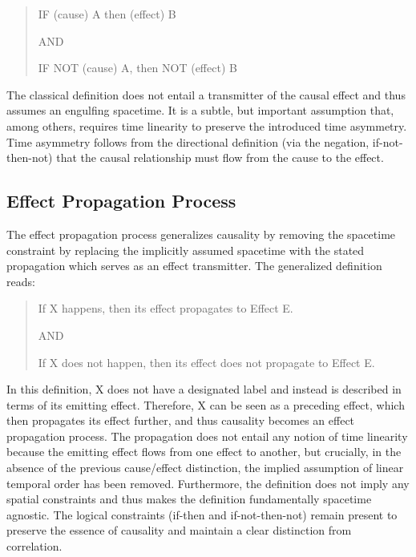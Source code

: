\documentclass{article}
\begin{document}
\begin{quote}
\begin{center}
        IF (cause) A then (effect) B

    AND 
    
    IF NOT (cause) A, then NOT (effect) B
\end{center}
\end{quote}


The classical definition does not entail a transmitter of the causal effect and thus assumes an engulfing spacetime. It is a subtle, but important assumption that, among others, requires time linearity to preserve the introduced time asymmetry. Time asymmetry follows from the directional definition (via the negation, if-not-then-not) that the causal relationship must flow from the cause to the effect.


\subsection{Effect Propagation Process}
\label{subsec:Effect_Propagation_Process}

The effect propagation process\cite{Hansen2025EPP} generalizes causality by removing the spacetime constraint by replacing the implicitly assumed spacetime with the stated propagation which serves as an effect transmitter. The generalized definition reads:

\begin{quote}
\begin{center}
        If X happens, then its effect propagates to Effect E.
    
    AND
    
    If X does not happen, then its effect does not propagate to Effect E.
\end{center}
\end{quote}


In this definition, X does not have a designated label and instead is described in terms of its emitting effect. Therefore, X can be seen as a preceding effect, which then propagates its effect further, and thus causality becomes an effect propagation process. The propagation does not entail any notion of time linearity because the emitting effect flows from one effect to another, but crucially, in the absence of the previous cause/effect distinction, the implied assumption of linear temporal order has been removed.
Furthermore, the definition does not imply any spatial constraints and thus makes the definition fundamentally spacetime agnostic. The logical constraints (if-then and if-not-then-not) remain present to preserve the essence of causality and maintain a clear distinction from correlation.
\end{document}
